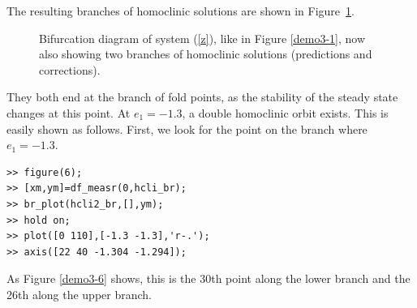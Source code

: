 \documentclass[10pt]{article}
\begin{document}
{The resulting branches of homoclinic solutions are shown in 
Figure~\ref{demo3-1b}.
\begin{figure}[ht]
\begin{center}
\caption{\small\label{demo3-1b}Bifurcation diagram of system (\ref{z}), like 
in Figure \ref{demo3-1}, now also showing two branches of homoclinic 
solutions (predictions and corrections).}
\end{center}
\end{figure}
They both end at the branch of fold points, as the stability of the 
steady state
changes at this point.  At $e_{1}=-1.3$, a double homoclinic orbit exists. 
This is easily shown as follows. First, we look for the point 
on the branch where $e_{1}=-1.3$.  
{\small\begin{verbatim}
>> figure(6);
>> [xm,ym]=df_measr(0,hcli_br);
>> br_plot(hcli2_br,[],ym);
>> hold on;
>> plot([0 110],[-1.3 -1.3],'r-.');
>> axis([22 40 -1.304 -1.294]);
\end{verbatim}}
As Figure \ref{demo3-6} shows, this is the 30th point along the lower branch 
and the 26th along the upper branch.
\begin{figure}[ht]
\begin{center}

\end{center}
\end{figure}}
\end{document}
